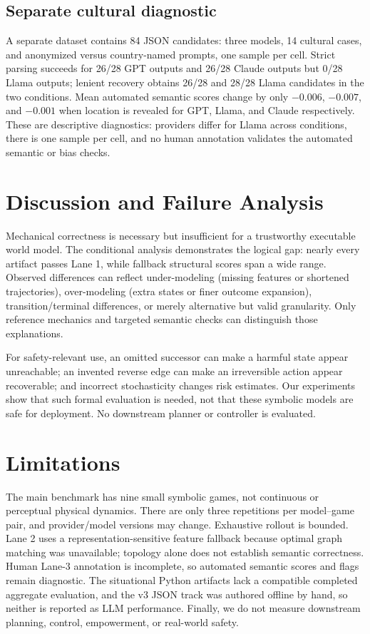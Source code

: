 \documentclass{article}
\begin{document}
\subsection{Separate cultural diagnostic}
A separate dataset contains 84 JSON candidates: three models, 14 cultural
cases, and anonymized versus country-named prompts, one sample per cell. Strict
parsing succeeds for 26/28 GPT outputs and 26/28 Claude outputs but 0/28 Llama
outputs; lenient recovery obtains 26/28 and 28/28 Llama candidates in the two
conditions. Mean automated semantic scores change by only $-0.006$, $-0.007$,
and $-0.001$ when location is revealed for GPT, Llama, and Claude respectively.
These are descriptive diagnostics: providers differ for Llama across
conditions, there is one sample per cell, and no human annotation validates the
automated semantic or bias checks.

\section{Discussion and Failure Analysis}
Mechanical correctness is necessary but insufficient for a trustworthy
executable world model. The conditional analysis demonstrates the logical gap:
nearly every artifact passes Lane 1, while fallback structural scores span a
wide range. Observed differences can reflect under-modeling (missing features
or shortened trajectories), over-modeling (extra states or finer outcome
expansion), transition/terminal differences, or merely alternative but valid
granularity. Only reference mechanics and targeted semantic checks can
distinguish those explanations.

For safety-relevant use, an omitted successor can make a harmful state appear
unreachable; an invented reverse edge can make an irreversible action appear
recoverable; and incorrect stochasticity changes risk estimates. Our experiments
show that such formal evaluation is needed, not that these symbolic models are
safe for deployment. No downstream planner or controller is evaluated.

\section{Limitations}
The main benchmark has nine small symbolic games, not continuous or perceptual
physical dynamics. There are only three repetitions per model--game pair, and
provider/model versions may change. Exhaustive rollout is bounded. Lane 2 uses
a representation-sensitive feature fallback because optimal graph matching was
unavailable; topology alone does not establish semantic correctness. Human
Lane-3 annotation is incomplete, so automated semantic scores and flags remain
diagnostic. The situational Python artifacts lack a compatible completed
aggregate evaluation, and the v3 JSON track was authored offline by hand, so
neither is reported as LLM performance. Finally, we do not measure downstream
planning, control, empowerment, or real-world safety.
\end{document}
